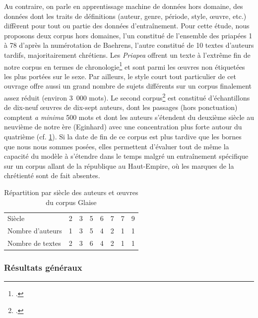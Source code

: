 Au contraire, on parle en apprentissage machine de données hors domaine, des données dont les traits de définitions (auteur, genre, période, style, œuvre, etc.) diffèrent pour tout ou partie des données d'entraînement. Pour cette étude, nous proposons deux corpus hors domaines, l'un constitué de l'ensemble des priapées 1 à 78 d'après la numérotation de Baehrens, l'autre constitué de 10 textes d'auteurs tardifs, majoritairement chrétiens. Les \textit{Priapea} offrent un texte à l'extrême fin de notre corpus en termes de chronologie\footcite{citroni_les_2008} et sont parmi les œuvres non étiquetées les plus portées sur le sexe. Par ailleurs, le style court tout particulier de cet ouvrage offre aussi un grand nombre de sujets différents sur un corpus finalement assez réduit (environ 3~000 mots). Le second corpus\footcite{glaise_2020_corpus_tardif} est constitué d'échantillons de dix-neuf œuvres de dix-sept auteurs, dont les passages (hors ponctuation) comptent \textit{a minima} 500 mots et dont les auteurs s'étendent du deuxième siècle au neuvième de notre ère (Eginhard) avec une concentration plus forte autour du quatrième (cf. \ref{corpus:glaise:dates}). Si la date de fin de ce corpus est plus tardive que les bornes que nous nous sommes posées, elles permettent d'évaluer tout de même la capacité du modèle à s'étendre dans le temps malgré un entraînement spécifique sur un corpus allant de la république au Haut-Empire, où les marques de la chrétienté sont de fait absentes.

\begin{table}[h]
\begin{tabular}{l|rrrrrrr}
Siècle           & 2 & 3 & 5 & 6 & 7 & 7 & 9 \\
Nombre d'auteurs & 1 & 3 & 5 & 4 & 2 & 1 & 1 \\
Nombre de textes & 2 & 3 & 6 & 4 & 2 & 1 & 1
\end{tabular}
\caption{Répartition par siècle des auteurs et œuvres du corpus Glaise}
\label{corpus:glaise:dates}
\end{table}

\subsubsection{Résultats généraux}

